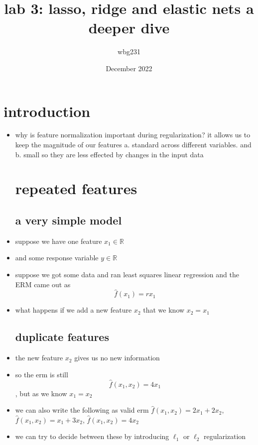 \documentclass{article}
\title{lab 3: lasso, ridge and elastic nets a deeper dive }
\author{wbg231 }
\date{December 2022}
\begin{document}
\maketitle

\section{introduction}
\begin{itemize}
\item why is feature normalization important during regularization? it allows us to keep the magnitude of our features a. standard across different variables. and b. small so they are less effected by changes in the input data 
\section{repeated features}
\subsection{a very simple model}
\item suppose we have one feature $x_1\in \mathbb{R}$
\item and some response variable $y\in \mathbb{R}$
\item suppose we got some data and ran least squares linear regression and the ERM came out as $$\hat{f}(x_1)=rx_1$$
\item what happens if we add a new feature $x_2$ that we know $x_2=x_1$
\subsection{duplicate features}
\item the new feature $x_2$ gives us no new information 
\item so the erm is still $$\hat{f}(x_1,x_2)=4x_1$$, but as we know $x_1=x_2$
\item we can also write the following as valid erm $\hat{f}(x_1,x_2)=2x_1+2x_2$, $\hat{f}(x_1,x_2)=x_1+3x_2$, $\hat{f}(x_1,x_2)=4x_2$
\item we can try to decide between these by introducing $\ell_{1}$ or $\ell_{2}$ regularization 

\end{itemize}
\end{document}
